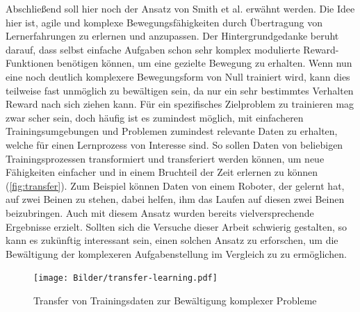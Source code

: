 Abschließend soll hier noch der Ansatz von Smith et al. \cite{smith2023learning} erwähnt werden.
Die Idee hier ist, agile und komplexe Bewegungsfähigkeiten durch Übertragung von Lernerfahrungen zu erlernen und anzupassen.
Der Hintergrundgedanke beruht darauf, dass selbst einfache Aufgaben schon sehr komplex modulierte Reward-Funktionen benötigen können, um eine gezielte Bewegung zu erhalten.
Wenn nun eine noch deutlich komplexere Bewegungsform von Null trainiert wird, kann dies teilweise fast unmöglich zu bewältigen sein, da nur ein sehr bestimmtes Verhalten Reward nach sich ziehen kann.
Für ein spezifisches Zielproblem zu trainieren mag zwar scher sein, doch häufig ist es zumindest möglich, mit einfacheren Trainingsumgebungen und Problemen zumindest relevante Daten zu erhalten, welche für einen Lernprozess von Interesse sind.
So sollen Daten von beliebigen Trainingsprozessen transformiert und transferiert werden können, um neue Fähigkeiten einfacher und in einem Bruchteil der Zeit erlernen zu können (\autoref{fig:transfer}).
Zum Beispiel können Daten von einem Roboter, der gelernt hat, auf zwei Beinen zu stehen, dabei helfen, ihm das Laufen auf diesen zwei Beinen beizubringen.
Auch mit diesem Ansatz wurden bereits vielversprechende Ergebnisse erzielt.
Sollten sich die Versuche dieser Arbeit schwierig gestalten, so kann es zukünftig interessant sein, einen solchen Ansatz zu erforschen, um die Bewältigung der komplexeren Aufgabenstellung im Vergleich zu \cite{waidner.2020} zu ermöglichen.


\begin{figure}
    \centering
    \texttt{[image: Bilder/transfer-learning.pdf]}
    \caption{Transfer von Trainingsdaten zur Bewältigung komplexer Probleme \cite{smith2023learning}}
    \label{fig:transfer}
\end{figure}
